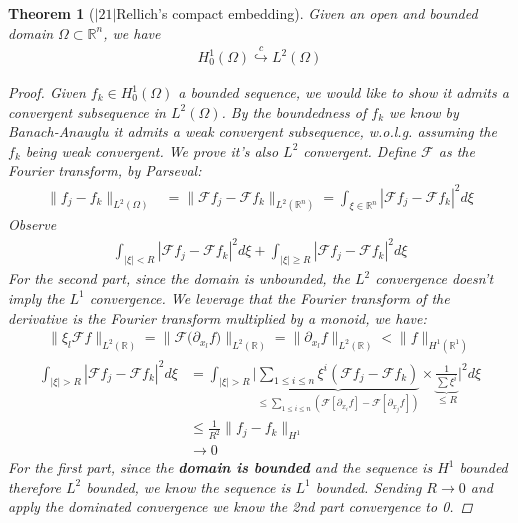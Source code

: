 \documentclass[a4paper,11pt,oneside,fleqn]{book}
\newtheorem{theorem}{Theorem}[section]
\theoremstyle{definition}
\theoremstyle{remark}
\begin{document}
\begin{theorem}[$|21|$Rellich's compact embedding]
Given an open and bounded domain $\Omega \subset \mathbb{R}^n$, we have 
\begin{align*}
	H_0^1(\Omega) \overset{c}{\hookrightarrow} L^2(\Omega)
\end{align*}
	
\begin{proof}
	Given $f_k \in H_0^1(\Omega)$ a bounded sequence, we would like to show it admits a convergent subsequence in $L^2(\Omega)$. By the boundedness of $f_k$ we know by Banach-Anauglu it admits a weak convergent subsequence, w.o.l.g. assuming the $f_k$ being weak convergent. We prove it's also $L^2$ convergent. Define $\mathcal{F}$ as the Fourier transform, by Parseval:
	\begin{align*}
		\|f_j - f_k\|_{L^2(\Omega)} &= \|\mathcal{F}f_j - \mathcal{F}f_k\|_{L^2(\mathbb{R}^n)}
		= \int_{\xi \in \mathbb{R}^n} |\mathcal{F}f_j - \mathcal{F} f_k|^2 d\xi
	\end{align*}
	Observe
	\begin{align*}
		\int_{|\xi| < R} |\mathcal{F}f_j - \mathcal{F} f_k|^2 d\xi + \int_{|\xi| \ge R} |\mathcal{F}f_j - \mathcal{F} f_k|^2 d\xi
	\end{align*}
	For the second part, since the domain is unbounded, the $L^2$ convergence doesn't imply the $L^1$ convergence. We leverage that the Fourier transform of the derivative is the Fourier transform multiplied by a monoid, we have:
	\begin{align*}
		\|\xi_l \mathcal{F} f\|_{L^2(\mathbb{R})} = \bigg\|\mathcal{F} \bigg(\partial_{x_l} f\bigg)\bigg\|_{L^2(\mathbb{R})} = \|\partial_{x_l} f\|_{L^2(\mathbb{R})} < \|f\|_{H^1(\mathbb{R}^1)}
	\end{align*}
	\begin{align*}
		\int_{|\xi| > R} |\mathcal{F}f_j - \mathcal{F}f_k|^2 d\xi 
		& = \int_{|\xi| >R} \bigg| \underbrace{ \sum_{1 \le i \le n} \xi^i (\mathcal{F}f_j - \mathcal{F} f_k)}_{ \le \sum_{ 1 \le i \le n } (\mathcal{F} [\partial_{x_i} f] - \mathcal{F}[\partial_{x_j} f])  }  \times \underbrace{ \frac{1}{\sum \xi^i}}_{\le R} \bigg|^2 d\xi \\
		&\le  \frac{1}{R^2} \|f_j - f_k\|_{H^1} \\
		&\rightarrow 0
	\end{align*}
	For the first part, since the \textbf{domain is bounded} and the sequence is $H^1$ bounded therefore $L^2$ bounded, we know the sequence is $L^1$ bounded. Sending $R \rightarrow 0$ and apply the dominated convergence we know the 2nd part convergence to 0.
\end{proof}
\end{theorem}
\end{document}
